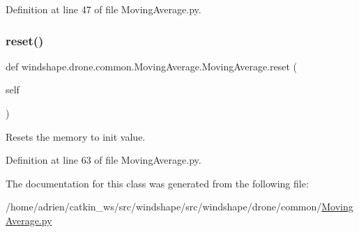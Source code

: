 Definition at line 47 of file Moving\+Average.\+py.

\mbox{\label{classwindshape_1_1drone_1_1common_1_1_moving_average_1_1_moving_average_a3ab8f769d43e4da70a42f0f7244c0413}} 
\subsubsection{\texorpdfstring{reset()}{reset()}}
{\footnotesize\ttfamily def windshape.\+drone.\+common.\+Moving\+Average.\+Moving\+Average.\+reset (\begin{DoxyParamCaption}\item[{}]{self }\end{DoxyParamCaption})}

\begin{DoxyVerb}Resets the memory to init value.\end{DoxyVerb}
 

Definition at line 63 of file Moving\+Average.\+py.



The documentation for this class was generated from the following file\+:\begin{DoxyCompactItemize}
\item 
/home/adrien/catkin\+\_\+ws/src/windshape/src/windshape/drone/common/\mbox{\hyperlink{_moving_average_8py}{Moving\+Average.\+py}}\end{DoxyCompactItemize}
